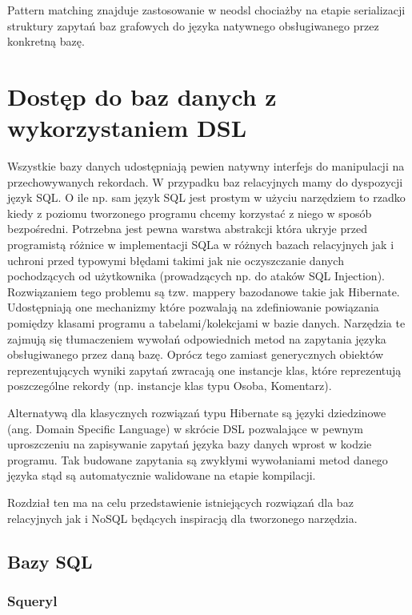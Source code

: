 \documentclass[brudnopis]{xmgr}
\begin{document}


Pattern matching znajduje zastosowanie w neodsl chociażby na etapie serializacji struktury zapytań baz grafowych do języka natywnego obsługiwanego przez konkretną bazę.

\chapter{Dostęp do baz danych z wykorzystaniem DSL}

Wszystkie bazy danych udostępniają pewien natywny interfejs do manipulacji na przechowywanych rekordach. W przypadku baz relacyjnych mamy do dyspozycji język SQL. O ile np. sam język SQL jest prostym w użyciu narzędziem to rzadko kiedy z poziomu tworzonego programu chcemy korzystać z niego w sposób bezpośredni. Potrzebna jest pewna warstwa abstrakcji która ukryje przed programistą różnice w implementacji SQLa w różnych bazach relacyjnych jak i uchroni przed typowymi błędami takimi jak nie oczyszczanie danych pochodzących od użytkownika (prowadzących np. do ataków SQL Injection). Rozwiązaniem tego problemu są tzw. mappery bazodanowe takie jak Hibernate. Udostępniają one mechanizmy które pozwalają na zdefiniowanie powiązania pomiędzy klasami programu a tabelami/kolekcjami w bazie danych. Narzędzia te zajmują się tłumaczeniem wywołań odpowiednich metod na zapytania języka obsługiwanego przez daną bazę. Oprócz tego zamiast generycznych obiektów reprezentujących wyniki zapytań zwracają one instancje klas, które reprezentują poszczególne rekordy (np. instancje klas typu Osoba, Komentarz).

Alternatywą dla klasycznych rozwiązań typu Hibernate są języki dziedzinowe (ang. Domain Specific Language) w skrócie DSL pozwalające w pewnym uproszczeniu na zapisywanie zapytań języka bazy danych wprost w kodzie programu. Tak budowane zapytania są zwykłymi wywołaniami metod danego języka stąd są automatycznie walidowane na etapie kompilacji.

Rozdział ten ma na celu przedstawienie istniejących rozwiązań dla baz relacyjnych jak i NoSQL będących inspiracją dla tworzonego narzędzia.

\section{Bazy SQL}

\subsection{Squeryl}
\end{document}
